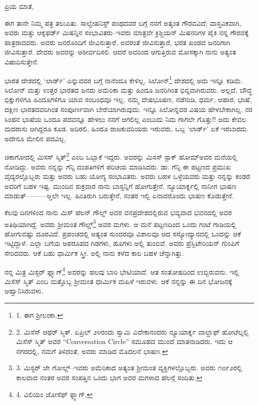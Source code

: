 ಪ್ರಿಯ ಮಾತೆ,

ಈಗ ತಾನೇ ನಿಮ್ಮ ಪತ್ರ ತಲುಪಿತು. ಸಾಲ್ವೇಷನಿಸ್ಟ್ ಪಂಥದವರ ಬಗ್ಗೆ ನನಗೆ ಅತ್ಯಂತ ಗೌರವವಿದೆ; ವಾಸ್ತವಿಕವಾಗಿ, ಅವರು ಮತ್ತು ಆಕ್ಸಫರ್ಡ್ ಮಿಷನ್ನಿನ ಸಂಭಾವಿತರು–ಇವರು ಮಾತ್ರವೇ ಕ್ರಿಶ್ಚಿಯನ್ ಮಿಷನರಿಗಳ ಪೈಕಿ ನನ್ನ ಗೌರವಕ್ಕೆ ಪಾತ್ರರಾದವರು. ಅವರು ಜನರೊಂದಿಗೆ ಜೀವಿಸುತ್ತಾರೆ, ಅವರಂತೆ ಜೀವಿಸುತ್ತಾರೆ, ಭರತ ಖಂಡದ ಜನರಿಗಾಗಿ ಜೀವಿಸುತ್ತಾರೆ. ದೇವರು ಅವರನ್ನು ಆಶೀರ್ವದಿಸಲಿ. ಆದರೆ ಅವರಿಂದ ಆಗುತ್ತಿರುವ ಮೋಸಕ್ಕಾಗಿ ನಾನು ಅತ್ಯಂತ ವಿಷಾದಿಸುತ್ತೇನೆ.

ಭಾರತ ದೇಶದಲ್ಲಿ ‘ಲಾರ್ಡ್’ ಎನ್ನುವವರ ಬಗ್ಗೆ ನಾನೆಂದೂ ಕೇಳಿಲ್ಲ, ಸಿಲೋನ್\footnote{1. ಈಗ ಶ‍್ರೀಲಂಕಾ.} ದೇಶದಲ್ಲಿ ಅದು ಇನ್ನೂ ಕಡಿಮೆ. ಸಿಲೋನ್ ಮತ್ತು ಉತ್ತರ ಭಾರತದ ಜನರು ಅಮೆರಿಕಾ ಮತ್ತು ಹಿಂದೂ ಜನರಿಗಿಂತ ಭಿನ್ನವಾಗಿರುವರು. ಅಲ್ಲದೆ, ಬೌದ್ಧ ಭಿಕ್ಷುಗಳಿಗೂ ಹಿಂದೂಗಳಿಗೂ ಯಾವ ಸಂಬಂಧವೂ ಇಲ್ಲ. ನಮ್ಮ ವೇಷಭೂಷಣ, ನಡೆನುಡಿ, ಧರ್ಮ, ಆಹಾರ, ಭಾಷೆ, ದಕ್ಷಿಣ ಭಾರತದವರಿಗಿಂತ ಸಂಪೂರ್ಣವಾಗಿ ಬೇರೆಯಾಗಿರುವುದು. ಇನ್ನೂ ಸಿಲೋನ್ನವರ ವಿಷಯ ಹೇಳಬೇಕಾಗಿಲ್ಲ. ನರ ಸಿಂಹನ ಭಾಷೆಯ ಒಂದೂ ಪದವನ್ನೂ ಹೇಳಲು ನನಗೆ ಆಗಲಿಲ್ಲ ಎಂಬುದು ನಿಮ ಗಾಗಲೇ ಗೊತ್ತು!! ಅದು ಕೇವಲ ಮದರಾಸು ಆಗಿದ್ದರೂ ಕೂಡ. ಅದಿರಲಿ, ಹಿಂದೂ ರಾಜಕುವರಿಯರು ಇರುವರು, ಒಬ್ಬ ‘ಲಾರ್ಡ್’ ಏಕೆ ಇರಬಾರದು. ಅದೇನೂ ಮೇಲಿನ ಪದವಿಲ್ಲ.

ಚಿಕಾಗೋದಲ್ಲಿ ಮಿಸಸ್ ಸ್ಮಿತ್\footnote{2. ಮಿಸೆಸ್ ಆಥರ್ ಸ್ಮಿತ್. ಏಪ್ರಿಲ್ ೨೪ರಂದು ಸ್ವಾಮಿ ವಿವೇಕಾನಂದರು ನ್ಯೂಯಾರ್ಕ್ನ ವಾಲ್ಡಾಫ್ ಹೋಟೆಲ್ನಲ್ಲಿ ಮಿಸೆಸ್ ಸ್ಮಿತ್ ಅವರ “Conversation Circle” ಸಮೂಹದ ಮುಂದೆ ಮಾತನಾಡಿದರು. ಇದು ಆ ನಗರದಲ್ಲಿ, ನಮಗೆ ತಿಳಿದಂತೆ, ಅವರು ಮಾಡಿದ ಮೊದಲನೆ ಭಾಷಣ.} ಎಂಬ ಒಬ್ಬಾಕೆ ಇದ್ದರು. ಅವರನ್ನು ಮಿಸಸ್ ಸ್ಟಾಕ್ ಹೋಮ್​ ಅವರ ಮನೆಯಲ್ಲಿ ನೋಡಿದ್ದು. ಅವರು ನನ್ನನ್ನು ಗೆನ್ಸಿ ದಂಪತಿಗಳಿಗೆ ಪರಿಚಯ ಮಾಡಿಸಿದರು. ಡಾ. ಗೆನ್ಸಿ ಈ ಪಟ್ಟಣದ ಪ್ರಮುಖ ವೈದ್ಯರಲ್ಲೊಬ್ಬರು ಮತ್ತು ಅವರು ಬಹು ಯೋಗ್ಯ ಸಂಭಾವಿತರು. ಅವರು ಬಹಳ ಒಳ್ಳೆಯವರು ಮತ್ತು ನನ್ನನ್ನು ಕಂಡರೆ ಅವರಿಗೆ ಬಹಳ ಇಷ್ಟ. ಮುಂದಿನ ಶುಕ್ರವಾರ ನಾನು ಬಾಸ್ಟನ್ನಿಗೆ ಹೋಗುತ್ತೇನೆ. ನ್ಯೂಯಾರ್ಕ್ನಲ್ಲಿ ನಾನೀಗ ಭಾಷಣ ಮಾಡುತ್––––––ಅ್ತಲೇ ಇಲ್ಲ. ಹಿಂತಿರುಗಿ ಬರುತ್ತೇನೆ, ನಂತರ ಇಲ್ಲಿ ಏನಾದರೊಂದು ಭಾಷಣ ಕೊಡುತ್ತೇನೆ.

ಕೆಲವು ದಿನಗಳಿಂದ ನಾನು ಮಿಸ್ ಹೆಲನ್ ಗೌಲ್ಡ್ ಅವರ ವನಪ್ರದೇಶದಲ್ಲಿರುವ ಭವ್ಯವಾದ ಭವನದಲ್ಲಿ ಅವರ ಅತಿಥಿಯಾಗಿದ್ದೆ. ಅವರು ಶ‍್ರೀಮಂತ ಗೌಲ್ಡ್\footnote{3. ಮಿಸ್ಟರ್ ಜೇ ಗೋಲ್ಡ್–ಇವರು ಅಮೆರಿಕಾದ ಅತ್ಯಂತ ಶ‍್ರೀಮಂತ ವ್ಯಕ್ತಿಗಳಲ್ಲೊಬ್ಬರು. ಅವರು ೧೮೯೨ರಲ್ಲಿ ಕಾಲವಾದ ನಂತರ ಅವರ ಸಂಪತ್ತಿನ ಒಂದು ಭಾಗ ಅವರ ಮಗಳಾದ ಹೆಲನ್ಗೆ ಸಂದಿತು.} ಅವರ ಮಗಳು. ಆ ಮನೆ ಪಟ್ಟಣದಿಂದ ಒಂದು ಗಂಟೆ ಗಾಡಿಯಲ್ಲಿ ಹೋಗುವಷ್ಟು ದೂರವಿದೆ. ಪ್ರಪಂಚದಲ್ಲಿ ಅತ್ಯಂತ ಸುಂದರವೂ ವಿಶಾಲವೂ ಆದ ಸಸ್ಯೋದ್ಯಾನದಲ್ಲಿ ಒಂದನ್ನು ಆಕೆ ಇಟ್ಟಿದ್ದಾಳೆ. ಎಲ್ಲಾ ಬಗೆಯ ಅಪರೂಪದ ಗಿಡಗಳು, ಹೂಗಳು ಅಲ್ಲಿ ತುಂಬಿವೆ. ಅವರು ಪ್ರೆಸ್ಬಿಟೇರಿಯನ್ ಗುಂಪಿಗೆ ಸೇರಿದವರು. ಆಕೆ ಬಹು ಧಾರ್ಮಿಕ ಸ್ತ್ರೀ. ಅಲ್ಲಿ ನಾನು ಕಳೆದ ಕಾಲ ಬಹಳ ಚೆನ್ನಾಗಿತ್ತು.

ನನ್ನ ಮಿತ್ರ ಮಿಸ್ಟರ್ ಫ್ಲ್ಯಾಗ್\footnote{4. ವಿಲಿಯಂ ಜೋಸೆಫ್ ಫ್ಲ್ಯಾಗ್.} ಅವರನ್ನು ಹಲವು ಬಾರಿ ಭೇಟಿಯಾದೆ. ಆತ ಸಂತೋಷದಿಂದ ಉಬ್ಬಿರುವನು. ಇಲ್ಲಿ ಮಿಸೆಸ್ ಸ್ಮಿತ್ ಎಂಬ ಮತ್ತೊಬ್ಬ ಶ‍್ರೀಮಂತ ಧಾರ್ಮಿಕ ಮಹಿಳೆ ಇರುವಳು. ಆಕೆ ನನ್ನನ್ನು ಈ ದಿನ ಭೋಜನಕ್ಕೆ ಆಹ್ವಾನಿಸಿರುವಳು.


